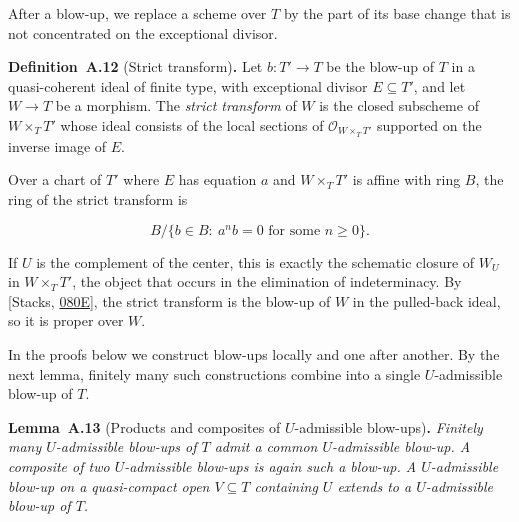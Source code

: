 \documentclass[11pt]{article}
\newenvironment{bpstatement}[2]{\par\addvspace{0.6\baselineskip}\noindent\textbf{#1}#2\textbf{.}\enspace\ignorespaces}
  {\par\addvspace{0.4\baselineskip}}
\newenvironment{bpstatementit}[2]{\begin{bpstatement}{#1}{#2}\itshape\ignorespaces}{\end{bpstatement}}
\begin{document}
\label{bp32}%
After a blow-up, we replace a scheme over \(T\) by the part of its base change that is not concentrated on the exceptional divisor.

\label{bp33}%
\begin{bpstatement}{Definition~A.12}{ (Strict transform)}
Let \(b:T'\to T\) be the blow-up of \(T\) in a quasi-coherent ideal of finite type, with exceptional divisor \(E\subseteq T'\), and let \(W\to T\) be a morphism. The \emph{strict transform} of \(W\) is the closed subscheme of \(W\times_TT'\) whose ideal consists of the local sections of \(\mathcal O_{W\times_TT'}\) supported on the inverse image of \(E\).
\end{bpstatement}

\label{bp34}%
Over a chart of \(T'\) where \(E\) has equation \(a\) and \(W\times_TT'\) is affine with ring \(B\), the ring of the strict transform is

\[
B/\{b\in B:\ a^nb=0\text{ for some }n\geq0\}.
\]

If \(U\) is the complement of the center, this is exactly the schematic closure of \(W_U\) in \(W\times_TT'\), the object that occurs in the elimination of indeterminacy. By [Stacks, \href{https://stacks.math.columbia.edu/tag/080E}{080E}], the strict transform is the blow-up of \(W\) in the pulled-back ideal, so it is proper over \(W\).

In the proofs below we construct blow-ups locally and one after another. By the next lemma, finitely many such constructions combine into a single \(U\)-admissible blow-up of \(T\).

\label{bp35}%
\begin{bpstatementit}{Lemma~A.13}{ (Products and composites of $U$-admissible blow-ups)}
Finitely many \(U\)-admissible blow-ups of \(T\) admit a common \(U\)-admissible blow-up. A composite of two \(U\)-admissible blow-ups is again such a blow-up. A \(U\)-admissible blow-up on a quasi-compact open \(V\subseteq T\) containing \(U\) extends to a \(U\)-admissible blow-up of \(T\).
\end{bpstatementit}
\end{document}
